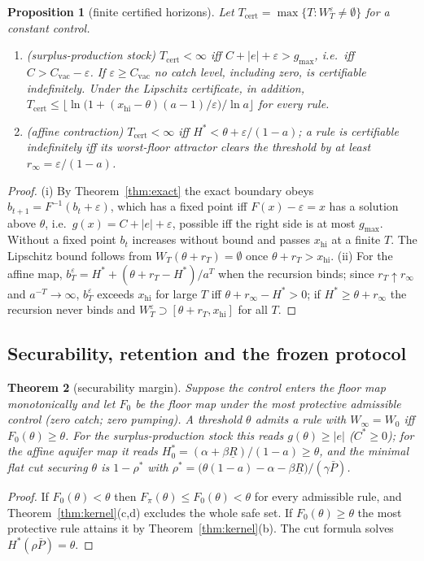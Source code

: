 \documentclass[11pt,a4paper]{article}
\theoremstyle{plain}
\newtheorem{theorem}{Theorem}[section]
\newtheorem{proposition}[theorem]{Proposition}
\theoremstyle{definition}
\theoremstyle{remark}
\newcommand{\safe}{W_0}
\newcommand{\LRP}{\theta}
\newcommand{\Cstar}{C^{*}}
\newcommand{\Cvac}{C_{\mathrm{vac}}}
\newcommand{\gmax}{g_{\max}}
\newcommand{\Hstar}{H^{*}}
\newcommand{\Pbar}{\bar P}
\newcommand{\Tcert}{T_{\mathrm{cert}}}
\begin{document}
\begin{proposition}[finite certified horizons]\label{prop:finite}
Let $\Tcert=\max\{T:W^{\varepsilon}_T\neq\emptyset\}$ for a constant control.
\begin{enumerate}[label=(\roman*)]
\item (surplus-production stock) $\Tcert<\infty$ iff $C+|e|+\varepsilon>\gmax$, i.e.\ iff $C>\Cvac-\varepsilon$. If $\varepsilon\ge\Cvac$ no catch level, including zero, is certifiable indefinitely. Under the Lipschitz certificate, in addition, $\Tcert\le\bigl\lfloor\ln\bigl(1+(x_{\mathrm{hi}}-\LRP)(a-1)/\varepsilon\bigr)/\ln a\bigr\rfloor$ for every rule.
\item (affine contraction) $\Tcert<\infty$ iff $\Hstar<\LRP+\varepsilon/(1-a)$; a rule is certifiable indefinitely iff its worst-floor attractor clears the threshold by at least $r_\infty=\varepsilon/(1-a)$.
\end{enumerate}
\end{proposition}
\begin{proof}
(i) By Theorem~\ref{thm:exact} the exact boundary obeys $b_{t+1}=F^{-1}(b_t+\varepsilon)$, which has a fixed point iff $F(x)-\varepsilon=x$ has a solution above $\LRP$, i.e.\ $g(x)=C+|e|+\varepsilon$, possible iff the right side is at most $\gmax$. Without a fixed point $b_t$ increases without bound and passes $x_{\mathrm{hi}}$ at a finite $T$. The Lipschitz bound follows from $W_T(\LRP+r_T)=\emptyset$ once $\LRP+r_T>x_{\mathrm{hi}}$. (ii) For the affine map, $b^{\varepsilon}_T=\Hstar+(\LRP+r_T-\Hstar)/a^{T}$ when the recursion binds; since $r_T\uparrow r_\infty$ and $a^{-T}\to\infty$, $b^{\varepsilon}_T$ exceeds $x_{\mathrm{hi}}$ for large $T$ iff $\LRP+r_\infty-\Hstar>0$; if $\Hstar\ge\LRP+r_\infty$ the recursion never binds and $W^{\varepsilon}_T\supset[\LRP+r_T,x_{\mathrm{hi}}]$ for all $T$.
\end{proof}

\subsection{Securability, retention and the frozen protocol}

\begin{theorem}[securability margin]\label{thm:margin}
Suppose the control enters the floor map monotonically and let $F_0$ be the floor map under the most protective admissible control (zero catch; zero pumping). A threshold $\LRP$ admits a rule with $W_\infty=\safe$ iff $F_0(\LRP)\ge\LRP$. For the surplus-production stock this reads $g(\LRP)\ge|e|$ ($\Cstar\ge0$); for the affine aquifer map it reads $\Hstar_0=(\alpha+\beta\underline R)/(1-a)\ge\LRP$, and the minimal flat cut securing $\LRP$ is $1-\rho^{*}$ with
$\rho^{*}=\bigl(\LRP(1-a)-\alpha-\beta\underline R\bigr)/(\gamma\Pbar)$.
\end{theorem}
\begin{proof}
If $F_0(\LRP)<\LRP$ then $F_\pi(\LRP)\le F_0(\LRP)<\LRP$ for every admissible rule, and Theorem~\ref{thm:kernel}(c,d) excludes the whole safe set. If $F_0(\LRP)\ge\LRP$ the most protective rule attains it by Theorem~\ref{thm:kernel}(b). The cut formula solves $\Hstar(\rho\Pbar)=\LRP$.
\end{proof}
\end{document}
